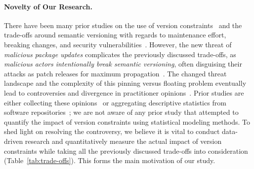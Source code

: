 \paragraph{Novelty of Our Research.} 
There have been many prior studies on the use of version constraints~\cite{DBLP:conf/msr/0001PSTB19, DBLP:journals/tse/DecanM21, DBLP:conf/msr/PinckneyCGB23, DBLP:conf/sp/LadisaPMB23} and the trade-offs  around semantic versioning with regards to maintenance effort, breaking changes, and security vulnerabilities~\cite{DBLP:journals/tse/JafariCAST22, DBLP:journals/tosem/BogartKHT21,DBLP:journals/jss/RaemaekersDV17}.
However, the new threat of \textit{malicious package updates} complicates the previously discussed trade-offs, as \emph{malicious actors intentionally break semantic versioning}, often disguising their attacks as patch releases for maximum propagation~\cite{node-ipc}.
The changed threat landscape and the complexity of this pinning versus floating problem eventually lead to controversies and divergence in practitioner opinions~\cite{facts-vs-feelings, renovate-discussion, pinning-only-work, DBLP:conf/sp/LadisaPMB23, DBLP:journals/tse/JafariCAST22}.
Prior studies are either collecting these opinions~\cite{DBLP:journals/tosem/BogartKHT21, DBLP:journals/tse/JafariCAST22, DBLP:conf/sp/LadisaPMB23} or aggregating descriptive statistics from software repositories~\cite{DBLP:conf/msr/0001PSTB19, DBLP:conf/msr/PinckneyCGB23, DBLP:journals/tse/DecanM21, DBLP:journals/jss/RaemaekersDV17}; we are not aware of any prior study that attempted to quantify the impact of version constraints using statistical modeling methods.
To shed light on resolving the controversy, we believe it is vital to conduct data-driven research and quantitatively measure the actual impact of version constraints while taking all the previously discussed trade-offs into consideration (Table~\ref{tab:trade-offs}).
This forms the main motivation of our study.